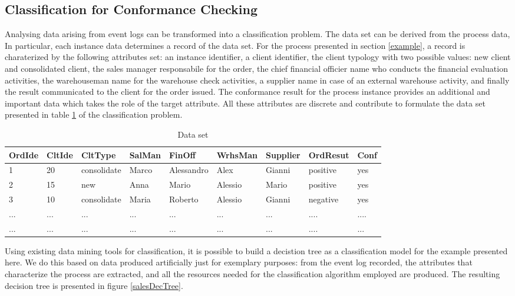 \documentclass{llncs}
\begin{document}
\subsection{Classification for Conformance Checking}
Analysing data arising from event logs can be transformed into a classification problem. The data set can be derived from the process data, In particular, each instance data determines a record of the data set. For the process presented in section \ref{example}, a record is charaterized by the following attributes set: an instance identifier, a client identifier, the client typology with two possible values: new client and consolidated client, the sales manager responsabile for the order, the chief financial officier name who conducts the financial evaluation activities, the warehouseman name for the warehouse check activities, a supplier name in case of an external warehouse activity, and finally the result communicated to the client for the order issued. The conformance result for the process instance provides an additional and important data which takes the role of the target attribute. All these attributes are discrete and contribute to formulate the data set presented in table \ref{tab:SaleData} of the classification problem.\\

\begin{table}[!h]
\scriptsize
\centering
\begin{tabular}{|p{1cm}|p{1cm}|p{}|p{}|p{}|p{}|p{1cm}|p{}|p{}|}
\hline OrdIde & CltIde & CltType & SalMan & FinOff & WrhsMan & Supplier & OrdResut & Conf\\
\hline
1 & 20 & consolidate & Marco & Alessandro & Alex & Gianni & positive & yes\\
\hline
2 & 15 & new & Anna & Mario & Alessio & Mario & positive & yes\\
\hline
3 & 10 &consolidate & Maria & Roberto & Alessio & Gianni & negative & yes\\
\hline
... & ... & ... & ... & ... & ... & ... & .... & .... \\
\hline
... & ... & ... & ... & ... & ... & ... & .... & ...  \\
\hline
\end{tabular}
\scriptsize
\caption{Data set}
\label{tab:SaleData}
\end{table}
\normalsize

Using existing data mining tools for classification, it is possible to build a decistion tree as a classification model for the example presented here. We do this based on data produced artificially just for exemplary purposes: from the event log recorded, the attributes that characterize the process are extracted, and all the resources needed for the classification algorithm employed are produced. The resulting decision tree is presented in figure \ref{salesDecTree}.\\
\end{document}
